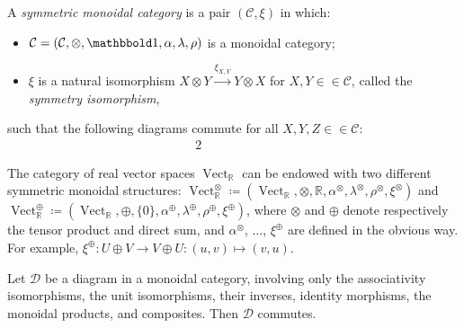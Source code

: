 \documentclass[10pt]{simplearticle}
\newcommand{\tikzinput}[1]{}
\newcommand{\tensorunit}{\mathbbold1}
\newcommand{\Vect}{\operatorname{Vect}}
\begin{document}
\begin{defn}\label{def:symmoncat}
A \emph{symmetric monoidal category} is a pair
$\left(\mathcal{C},\xi\right)$ in which:
\begin{itemize}
\item $\mathcal{C}=(\mathcal{C},\otimes,\tensorunit,\alpha,\lambda,\rho)$
is a monoidal category;
\item $\xi$ is a natural isomorphism $X\otimes Y\xrightarrow{\xi_{X,Y}}Y\otimes X$
for $X,Y\in\in\mathcal{C}$, called the \emph{symmetry isomorphism},
\end{itemize}
such that the following diagrams commute for all $X,Y,Z\in\in\mathcal{C}$:
\[
\tikzinput{d431}
\]
\begin{alignat*}{2}
\tikzinput{d432} & \qquad\qquad & \tikzinput{d433}
\end{alignat*}

\end{defn}

\begin{example}\label{exa:Vect-moncat}
The category of real vector spaces $\Vect_{\mathbb{R}}$
can be endowed with two different symmetric monoidal structures: $\Vect^{\otimes}_{\mathbb{R}}\coloneqq(\Vect_{\mathbb{R}},\otimes,\mathbb{R},\alpha^{\otimes},\lambda^{\otimes},\rho^{\otimes},\xi^{\otimes})$
and $\Vect^{\oplus}_{\mathbb{R}}\coloneqq(\Vect_{\mathbb{R}},\oplus,\{0\},\alpha^{\oplus},\lambda^{\oplus},\rho^{\oplus},\xi^{\oplus})$,
where $\otimes$ and $\oplus$ denote respectively the tensor product
and direct sum, and $\alpha^{\otimes}$, $\dots$, $\xi^{\oplus}$
are defined in the obvious way. For example, $\xi^{\oplus}\colon U\oplus V\to V\oplus U\colon(u,v)\mapsto(v,u)$.
\end{example}

\begin{thm}
\label{thm:coherence}
Let
$\mathcal{D}$ be a diagram in a monoidal category,
involving only the associativity isomorphisms, the unit isomorphisms,
their inverses, identity morphisms, the monoidal products, and composites.
Then $\mathcal{D}$ commutes.
\end{thm}
\end{document}
